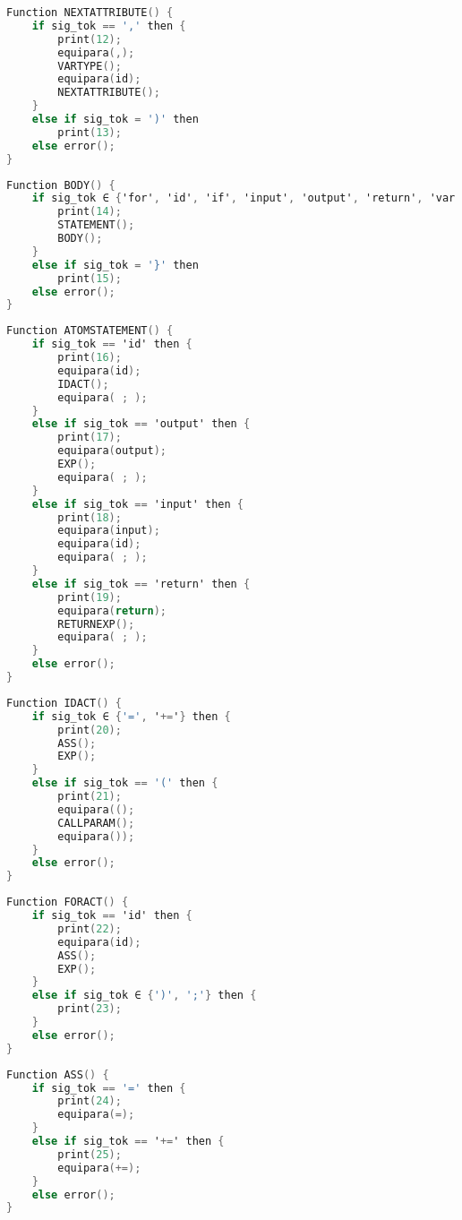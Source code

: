 \begin{lstlisting}[language=C, caption={NEXTATTRIBUTE}]
Function NEXTATTRIBUTE() {
    if sig_tok == ',' then {
        print(12);
        equipara(,);
        VARTYPE();
        equipara(id);
        NEXTATTRIBUTE();
    }
    else if sig_tok = ')' then 
        print(13);
    else error();
}
\end{lstlisting}

\begin{lstlisting}[language=C, caption={BODY}]
Function BODY() {
    if sig_tok ∈ {'for', 'id', 'if', 'input', 'output', 'return', 'var'} then {
        print(14);
        STATEMENT();
        BODY();
    }
    else if sig_tok = '}' then 
        print(15);
    else error();
}
\end{lstlisting}
\newpage
\begin{lstlisting}[language=C, caption={ATOMSTATEMENT}]
Function ATOMSTATEMENT() {
    if sig_tok == 'id' then {
        print(16);
        equipara(id);
        IDACT();
        equipara( ; );
    }
    else if sig_tok == 'output' then {
        print(17);
        equipara(output);
        EXP();
        equipara( ; );
    }
    else if sig_tok == 'input' then {
        print(18);
        equipara(input);
        equipara(id);
        equipara( ; );
    }
    else if sig_tok == 'return' then {
        print(19);
        equipara(return);
        RETURNEXP();
        equipara( ; );
    }
    else error();
}
\end{lstlisting}

\begin{lstlisting}[language=C, caption={IDACT}]
Function IDACT() {
    if sig_tok ∈ {'=', '+='} then {
        print(20);
        ASS();
        EXP();
    }
    else if sig_tok == '(' then {
        print(21);
        equipara(();
        CALLPARAM();
        equipara());
    }
    else error();
}
\end{lstlisting}

\begin{lstlisting}[language=C, caption={FORACT}]
Function FORACT() {
    if sig_tok == 'id' then {
        print(22);
        equipara(id);
        ASS();
        EXP();
    }
    else if sig_tok ∈ {')', ';'} then {
        print(23);
    }
    else error();
}
\end{lstlisting}
\newpage
\begin{lstlisting}[language=C, caption={ASS}]
Function ASS() {
    if sig_tok == '=' then {
        print(24);
        equipara(=);
    }
    else if sig_tok == '+=' then {
        print(25);
        equipara(+=);
    }
    else error();
}
\end{lstlisting}


